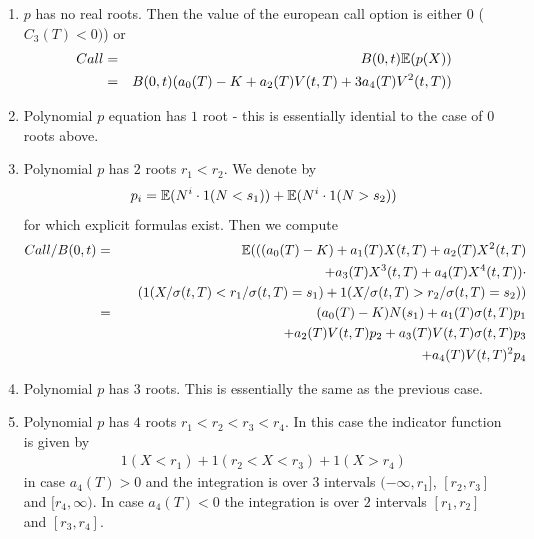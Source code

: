 \documentclass[12pt]{article}
\begin{document}
\begin {enumerate}
\item $p$ has no real roots. Then the value of the european call 
  option is either $0$ ($C_3 (T) < 0)$) or 
  \begin {eqnarray*}
    Call & = & B(0,t) \mathbb {E} ( p(X) )
    \\
    & = & B(0,t) (a_0(T) - K + a_2 (T) V(t,T) + 3 a_4 (T) V^2 (t,T) )
  \end {eqnarray*}

\item Polynomial $p$ equation has $1$ root - this is essentially idential 
  to the case of $0$ roots above. 

\item Polynomial $p$ has $2$ roots $r_1 < r_2$. We denote by 
  \begin {eqnarray*}
    p_i = \mathbb {E} ( N^i \cdot 1(N<s_1) ) + \mathbb {E} (N^i \cdot 1(N>s_2) )
  \end {eqnarray*}
  for which explicit formulas exist. 
  Then we compute 
  \begin {eqnarray*}
    Call /B(0,t) & = & \mathbb {E} ( 
    ( (a_0(T) - K) + a_1 (T) X(t,T) + a_2 (T) X^2(t,T) 
    \\
    &  & \quad 
    + a_3(T) X^3 (t,T) + a_4 (T) X^4 (t,T) ) 
    \cdot 
    \\
    &  & \quad ( 1(X/\sigma(t,T) < r_1 / \sigma (t,T) = s_1 ) + 
    1 ( X/ \sigma(t,T) > r_2 / \sigma (t,T) = s_2 ) )
    \\
    & = & (a_0(T) - K) N(s_1) + a_1 (T) \sigma(t,T) p_1 
    \\ 
    &  & \quad + a_2 (T) V(t,T) p_2 
    + a_3 (T) V(t,T) \sigma (t,T) p_3 
    \\
    &  & \quad 
    + a_4 (T) V(t,T)^2 p_4 
  \end {eqnarray*}
  
\item Polynomial $p$ has $3$ roots. This is essentially the same as 
  the previous case. 

\item Polynomial $p$ has $4$ roots $r_1 < r_2 < r_3 < r_4$. In this case 
  the indicator function is given by 
  \begin {eqnarray*}
    1(X < r_1) + 1 ( r_2 < X < r_3 ) + 1 (X > r_4 )
  \end {eqnarray*}
  in case $a_4 (T) > 0$ and the integration is over $3$ intervals 
  $(-\infty , r_1] $, $[r_2, r_3]$ and $ [r_4, \infty )$.
      In case $a_4 (T) <0$ the integration is over $2$ intervals 
      $[r_1,r_2]$ and $[r_3, r_4]$. 

\end {enumerate}
\end{document}
